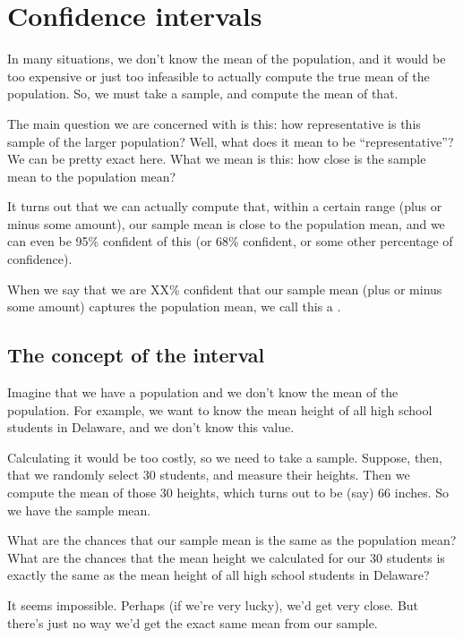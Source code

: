\documentclass[../../../main.tex]{subfiles}
\begin{document}
\chapter{Confidence intervals}

In many situations, we don't know the mean of the population, and it would be too expensive or just too infeasible to actually compute the true mean of the population. So, we must take a sample, and compute the mean of that. 

The main question we are concerned with is this: how representative is this sample of the larger population? Well, what does it mean to be ``representative''? We can be pretty exact here. What we mean is this: how close is the sample mean to the population mean? 

It turns out that we can actually compute that, within a certain range (plus or minus some amount), our sample mean is close to the population mean, and we can even be 95\% confident of this (or 68\% confident, or some other percentage of confidence).

When we say that we are XX\% confident that our sample mean (plus or minus some amount) captures the population mean, we call this a .


\section{The concept of the interval}

Imagine that we have a population and we don't know the mean of the population. For example, we want to know the mean height of all high school students in Delaware, and we don't know this value. 

Calculating it would be too costly, so we need to take a sample. Suppose, then, that we randomly select 30 students, and measure their heights. Then we compute the mean of those 30 heights, which turns out to be (say) 66 inches. So we have the sample mean.

What are the chances that our sample mean is the same as the population mean? What are the chances that the mean height we calculated for our 30 students is exactly the same as the mean height of all high school students in Delaware? 

It seems impossible. Perhaps (if we're very lucky), we'd get very close. But there's just no way we'd get the exact same mean from our sample. 
\end{document}
